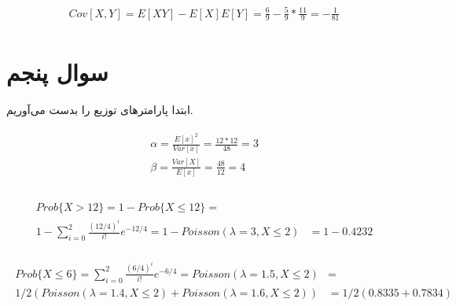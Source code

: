 \documentclass[paper=a4, fontsize=11pt]{article}
\numberwithin{equation}{section} %
\numberwithin{figure}{section} %
\numberwithin{table}{section} %
\begin{document}
\begin{align}
\begin{split}
    Cov[X,Y] = E[XY] - E[X]E[Y] = \frac{6}{9} - \frac{5}{9} * \frac{11}{9} = -\frac{1}{81}
\end{split}
\end{align}

\section{سوال پنجم}
ابتدا پارامتر‌های توزیع را بدست می‌آوریم.

\begin{align}
\begin{split}
    \alpha = \frac{E[x]^2}{Var[x]} = \frac{12 * 12}{48} = 3\\
    \beta = \frac{Var[X]}{E[x]} = \frac{48}{12} = 4\\
\end{split}
\end{align}

\begin{align}
\begin{split}
    Prob\{X > 12\} = 1 - Prob\{X \le 12\} =&\\
    1 - \sum_{i=0}^{2} \frac{(12/4)^i}{i!} e^{-12/4} = 1 - Poisson(\lambda = 3, X \le 2)
    &= 1 - 0.4232
\end{split}
\end{align}

\begin{align}
\begin{split}
    Prob\{X \le 6\} = \sum_{i=0}^{2} \frac{(6/4)^i}{i!} e^{-6/4} = Poisson(\lambda = 1.5, X \le 2) &=\\
    1/2 (Poisson(\lambda = 1.4, X \le 2) + Poisson(\lambda = 1.6, X \le 2)) &= 1/2(0.8335 + 0.7834)
\end{split}
\end{align}
\end{document}
